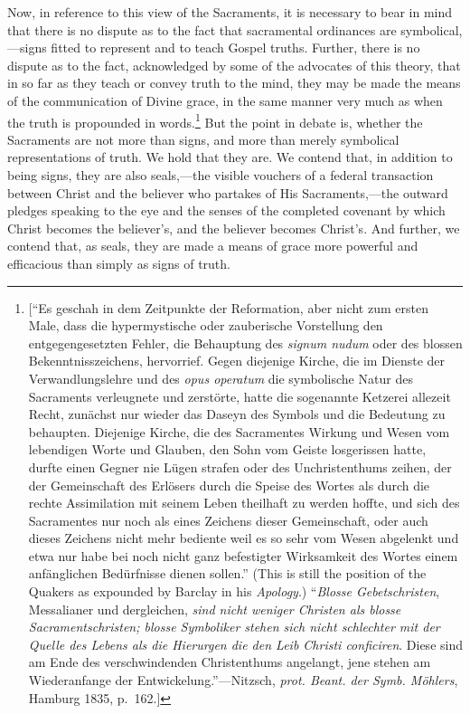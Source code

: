\documentclass[english,]{book}
\begin{document}
Now, in reference to this view of the Sacraments, it is necessary to bear in mind that there is no dispute as to the fact that sacramental ordinances are symbolical,---signs fitted to represent and to teach Gospel truths. Further, there is no dispute as to the fact, acknowledged by some of the advocates of this theory, that in so far as they teach or convey truth to the mind, they may be made the means of the communication of Divine grace, in the same manner very much as when the truth is propounded in words.\footnote{{[}``Es geschah in dem Zeitpunkte der Reformation, aber nicht zum ersten Male, dass die hypermystische oder zauberische Vorstellung den entgegengesetzten Fehler, die Behauptung des \emph{signum nudum} oder des blossen Bekenntnisszeichens, hervorrief. Gegen diejenige Kirche, die im Dienste der Verwandlungslehre und des \emph{opus operatum} die symbolische Natur des Sacraments verleugnete und zerstörte, hatte die sogenannte Ketzerei allezeit Recht, zunächst nur wieder das Daseyn des Symbols und die Bedeutung zu behaupten. Diejenige Kirche, die des Sacramentes Wirkung und Wesen vom lebendigen Worte und Glauben, den Sohn vom Geiste losgerissen hatte, durfte einen Gegner nie Lügen strafen oder des Unchristenthums zeihen, der der Gemeinschaft des Erlösers durch die Speise des Wortes als durch die rechte Assimilation mit seinem Leben theilhaft zu werden hoffte, und sich des Sacramentes nur noch als eines Zeichens dieser Gemeinschaft, oder auch dieses Zeichens nicht mehr bediente weil es so sehr vom Wesen abgelenkt und etwa nur habe bei noch nicht ganz befestigter Wirksamkeit des Wortes einem anfänglichen Bedürfnisse dienen sollen.'' (This is still the position of the Quakers as expounded by Barclay in his \emph{Apology}.) ``\emph{Blosse Gebetschristen}, Messalianer und dergleichen, \emph{sind nicht weniger Christen als blosse Sacramentschristen; blosse Symboliker stehen sich nicht schlechter mit der Quelle des Lebens als die Hierurgen die den Leib Christi conficiren}. Diese sind am Ende des verschwindenden Christenthums angelangt, jene stehen am Wiederanfange der Entwickelung.''---Nitzsch, \emph{prot. Beant. der Symb. Möhlers}, Hamburg 1835, p.~162.{]}} But the point in debate is, whether the Sacraments are not more than signs, and more than merely symbolical representations of truth. We hold that they are. We contend that, in addition to being signs, they are also seals,---the visible vouchers of a federal transaction between Christ and the believer who partakes of His Sacraments,---the outward pledges speaking to the eye and the senses of the completed covenant by which Christ becomes the believer's, and the believer becomes Christ's. And further, we contend that, as seals, they are made a means of grace more powerful and efficacious than simply as signs of truth.
\end{document}
